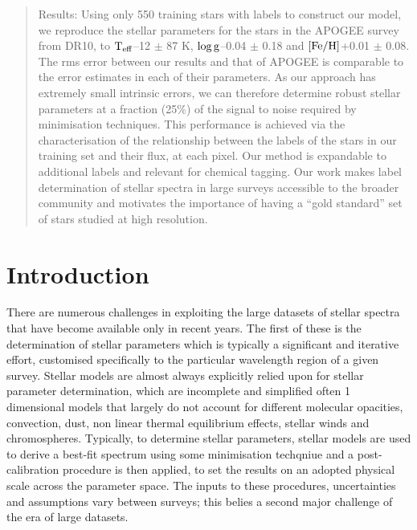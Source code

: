 \documentclass[12pt, preprint]{aastex}
\newcommand{\teff}{\mbox{$\rm T_{eff}$}}
\newcommand{\feh}{\mbox{$\rm [Fe/H]$}}
\newcommand{\logg}{\mbox{$\rm \log g$}}
\begin{document}
\begin{abstract}
Results:   Using only 550 training stars with labels to construct our model, we reproduce the stellar parameters for the stars in the APOGEE survey from DR10, to \teff --12 $\pm$ 87 K, \logg --0.04 $\pm$ 0.18 and \feh +0.01 $\pm$ 0.08. The rms error between our results and that of APOGEE is comparable to the error estimates in each of their parameters. As our approach has extremely small intrinsic errors,  we can therefore determine robust stellar parameters at a fraction (25\%) of the signal to noise required by minimisation techniques. This performance is achieved via the characterisation of the relationship between the labels of the stars in our training set and their flux, at each pixel. Our method is expandable to additional labels and relevant for chemical tagging.  Our work makes label determination of stellar spectra in large surveys accessible to the broader community and motivates the importance of having a ``gold standard'' set of stars studied at high resolution. \\



\end{abstract}

\section{Introduction}

There are numerous challenges in exploiting the large datasets of stellar spectra that have become available only in recent years. The first of these is the determination of stellar parameters which is typically a significant and iterative effort, customised specifically to the particular wavelength region of a given survey. Stellar models are almost always explicitly relied upon for stellar parameter determination, which are incomplete and simplified often 1 dimensional models that largely do not account for different molecular opacities, convection, dust, non linear thermal equilibrium effects, stellar winds and chromospheres. Typically, to determine stellar parameters, stellar models are used to derive a best-fit spectrum using some minimisation techqniue and a  post-calibration procedure is then applied, to set the results on an adopted physical scale across the parameter space. The inputs to these procedures, uncertainties and assumptions vary between surveys; this belies a second major challenge of the era of large datasets. \\
\end{document}
